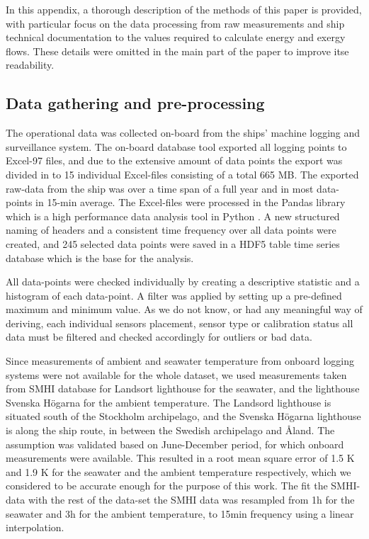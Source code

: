 \documentclass[preprint,12pt]{elsarticle}
\begin{document}
In this appendix, a thorough description of the methods of this paper is provided, with particular focus on the data processing from raw measurements and ship technical documentation to the values required to calculate energy and exergy flows. These details were omitted in the main part of the paper to improve itse readability. 


\subsection{Data gathering and pre-processing} \label{sec:app:met:gathering}

The operational data was collected on-board from the ships' machine logging and surveillance system. The on-board database tool exported all logging points to Excel-97 files, and due to the extensive amount of data points the export was divided in to 15 individual Excel-files consisting of a total 665 MB. The exported raw-data from the ship was over a time span of a full year and in most data-points in 15-min average. The Excel-files were processed in the Pandas library which is a high performance data analysis tool in Python \cite{mckinney-proc-scipy-2010}. A new structured naming of headers and a consistent time frequency over all data points were created, and 245 selected data points were saved in a HDF5 table time series database which is the base for the analysis.

All data-points were checked individually by creating a descriptive statistic and a histogram of each data-point. A filter was applied by setting up a pre-defined maximum and minimum value. As we do not know, or had any meaningful way of deriving, each individual sensors placement, sensor type or calibration status all data must be filtered and checked accordingly for outliers or bad data. 


Since measurements of ambient and seawater temperature from onboard logging systems were not available for the whole dataset, we used measurements taken from SMHI database for Landsort lighthouse for the seawater, and the lighthouse Svenska H\"{o}garna for the ambient temperature. The Landsord lighthouse is situated south of the Stockholm archipelago, and the Svenska H\"{o}garna lighthouse is along the ship route, in between the Swedish archipelago and Åland. The assumption was validated based on  June-December period, for which onboard measurements were available. This resulted in a root mean square error of 1.5 K and 1.9 K for the seawater and the ambient temperature respectively, which we considered to be accurate enough for the purpose of this work. The fit the SMHI-data with the rest of the data-set the SMHI data was resampled from 1h for the seawater and 3h for the ambient temperature, to 15min frequency using a linear interpolation.
\end{document}
